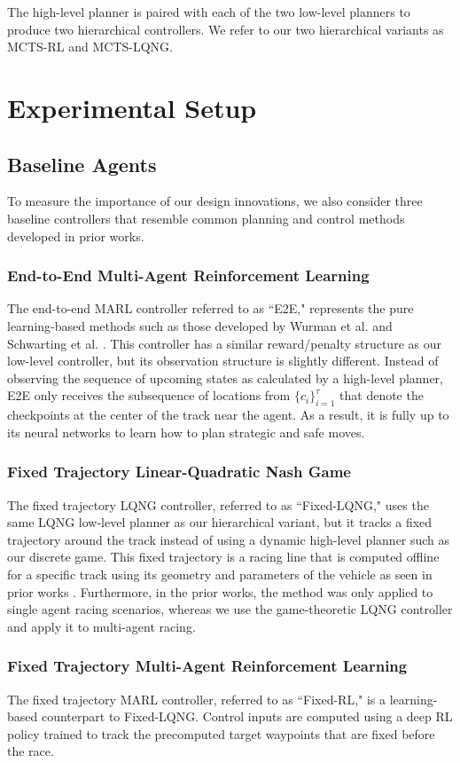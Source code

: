 The high-level planner is paired with each of the two low-level planners to produce two hierarchical controllers. We refer to our two hierarchical variants as MCTS-RL and MCTS-LQNG.

\section{Experimental Setup}
\subsection{Baseline Agents}
To measure the importance of our design innovations, we also consider three baseline controllers that resemble common planning and control methods developed in prior works.  
\subsubsection{End-to-End Multi-Agent Reinforcement Learning}
The end-to-end MARL controller referred to as ``E2E," represents the pure learning-based methods such as those developed by Wurman et al. and Schwarting et al. \cite{sonyai, Schwarting2021}. This controller has a similar reward/penalty structure as our low-level controller, but its observation structure is slightly different. Instead of observing the sequence of upcoming states as calculated by a high-level planner, E2E only receives the subsequence of locations from $\{c_i\}_{i=1}^{\tau}$ that denote the checkpoints at the center of the track near the agent. As a result, it is fully up to its neural networks to learn how to plan strategic and safe moves. 

\subsubsection{Fixed Trajectory Linear-Quadratic Nash Game}
The fixed trajectory LQNG controller, referred to as ``Fixed-LQNG," uses the same LQNG low-level planner as our hierarchical variant, but it tracks a fixed trajectory around the track instead of using a dynamic high-level planner such as our discrete game. This fixed trajectory is a racing line that is computed offline for a specific track using its geometry and parameters of the vehicle as seen in prior works \cite{Vazquez2020, Stahl2019_2}. Furthermore, in the prior works, the method was only applied to single agent racing scenarios, whereas we use the game-theoretic LQNG controller and apply it to multi-agent racing.

\subsubsection{Fixed Trajectory Multi-Agent Reinforcement Learning}
The fixed trajectory MARL controller, referred to as ``Fixed-RL," is a learning-based counterpart to Fixed-LQNG. Control inputs are computed using a deep RL policy trained to track the precomputed target waypoints that are fixed before the race.  
